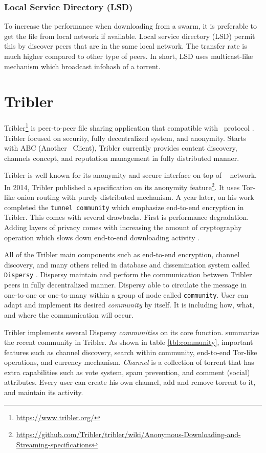 \subsubsection{Local Service Directory (LSD)}
To increase the performance when downloading from a swarm, it is preferable to get the file from local network if available. Local service directory (LSD) permit this by discover peers that are in the same local network. The transfer rate is much higher compared to other type of peers. In short, LSD uses multicast-like mechanism which broadcast infohash of a torrent.

\section{Tribler}
Tribler\footnote{\url{https://www.tribler.org/}} is peer-to-peer file sharing application that compatible with \bt~protocol \cite{2008:tribler:pouwelse}. Tribler focused on security, fully decentralized system, and anonymity. Starts with ABC (Another \bt~Client), Tribler currently provides content discovery, channels concept, and reputation management in fully distributed manner.

Tribler is well known for its anonymity and secure interface on top of \bt~ network. In 2014, Tribler published a specification on its anonymity feature\footnote{\url{https://github.com/Tribler/tribler/wiki/Anonymous-Downloading-and-Streaming-specifications}}. It uses Tor-like onion routing with purely distributed mechanism. A year later, \citeauthor{2015:tunnel:ruigrok} on his work completed the \texttt{tunnel community} which emphasize end-to-end encryption in Tribler. This comes with several drawbacks. First is performance degradation. Adding layers of privacy comes with increasing the amount of cryptography operation which slows down end-to-end downloading activity \cite{2015:tunnel:ruigrok}.

All of the Tribler main components such as end-to-end encryption, channel discovery, and many others relied in database and dissemination system called \texttt{Dispersy} \cite{2013:dispersy:zeilemaker}. Dispersy maintain and perform the communication between Tribler peers in fully decentralized manner. Dispersy able to circulate the message in one-to-one or one-to-many within a group of node called \texttt{community}. User can adapt and implement its desired \textit{community} by itself. It is including how, what, and where the communication will occur.

Tribler implements several Dispersy \textit{communities} on its core function. \citeauthor{2016:tribler-techdebt:vos} summarize the recent community in Tribler. As shown in table \ref{tbl:community}, important features such as channel discovery, search within community, end-to-end Tor-like operations, and currency mechanism. \textit{Channel} is a collection of torrent that has extra capabilities such as vote system, spam prevention, and comment (social) attributes. Every user can create his own channel, add and remove torrent to it, and maintain its activity.

